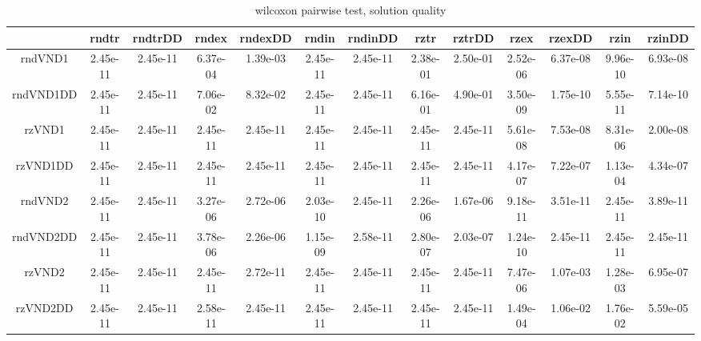 \documentclass[12pt,a4paper]{article}
\begin{document}
\begin{table}[!h]
\leftskip -2.1cm
{
\scriptsize
\begin{tabular}{|*{13}{c|}}
\hline
& rndtr & rndtrDD & rndex & rndexDD & rndin & rndinDD & rztr & rztrDD & rzex & rzexDD & rzin & rzinDD \\
\hline
rndVND1 & 2.45e-11 & 2.45e-11 & 6.37e-04 & 1.39e-03 & 2.45e-11 & 2.45e-11 & 2.38e-01 & 2.50e-01 & 2.52e-06 & 6.37e-08 & 9.96e-10 & 6.93e-08 \\
rndVND1DD & 2.45e-11 & 2.45e-11 & 7.06e-02 & 8.32e-02 & 2.45e-11 & 2.45e-11 & 6.16e-01 & 4.90e-01 & 3.50e-09 & 1.75e-10 & 5.55e-11 & 7.14e-10 \\
rzVND1 & 2.45e-11 & 2.45e-11 & 2.45e-11 & 2.45e-11 & 2.45e-11 & 2.45e-11 & 2.45e-11 & 2.45e-11 & 5.61e-08 & 7.53e-08 & 8.31e-06 & 2.00e-08 \\
rzVND1DD & 2.45e-11 & 2.45e-11 & 2.45e-11 & 2.45e-11 & 2.45e-11 & 2.45e-11 & 2.45e-11 & 2.45e-11 & 4.17e-07 & 7.22e-07 & 1.13e-04 & 4.34e-07 \\
rndVND2 & 2.45e-11 & 2.45e-11 & 3.27e-06 & 2.72e-06 & 2.03e-10 & 2.45e-11 & 2.26e-06 & 1.67e-06 & 9.18e-11 & 3.51e-11 & 2.45e-11 & 3.89e-11 \\
rndVND2DD & 2.45e-11 & 2.45e-11 & 3.78e-06 & 2.26e-06 & 1.15e-09 & 2.58e-11 & 2.80e-07 & 2.03e-07 & 1.24e-10 & 2.45e-11 & 2.45e-11 & 2.45e-11 \\
rzVND2 & 2.45e-11 & 2.45e-11 & 2.45e-11 & 2.72e-11 & 2.45e-11 & 2.45e-11 & 2.45e-11 & 2.45e-11 & 7.47e-06 & 1.07e-03 & 1.28e-03 & 6.95e-07 \\
rzVND2DD & 2.45e-11 & 2.45e-11 & 2.58e-11 & 2.45e-11 & 2.45e-11 & 2.45e-11 & 2.45e-11 & 2.45e-11 & 1.49e-04 & 1.06e-02 & 1.76e-02 & 5.59e-05\\
  \hline
\end{tabular}
\normalsize
}
\caption{wilcoxon pairwise test, solution quality}
\label{wilcoxon pairwise test VND-single neighbourhood}
\end{table} 
\end{document}
